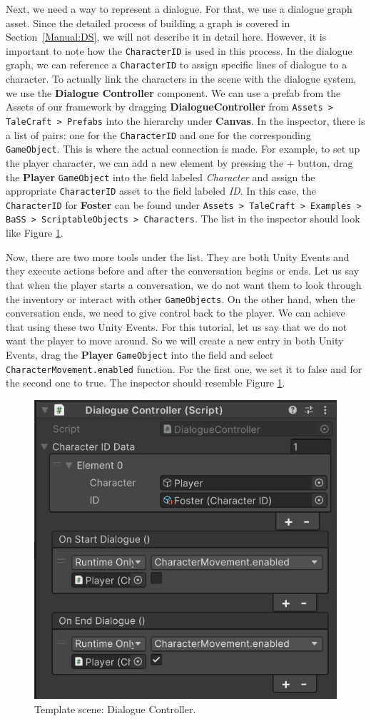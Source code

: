 Next, we need a way to represent a dialogue. For that, we use a dialogue graph asset. Since the detailed process of building a graph is covered in Section~\ref{Manual:DS}, we will not describe it in detail here. However, it is important to note how the \texttt{CharacterID} is used in this process. In the dialogue graph, we can reference a \texttt{CharacterID} to assign specific lines of dialogue to a character. To actually link the characters in the scene with the dialogue system, we use the \textbf{Dialogue Controller} component. We can use a prefab from the Assets of our framework by dragging \textbf{DialogueController} from \texttt{Assets > TaleCraft > Prefabs} into the hierarchy under \textbf{Canvas}. In the inspector, there is a list of pairs: one for the \texttt{CharacterID} and one for the corresponding \texttt{GameObject}. This is where the actual connection is made. For example, to set up the player character, we can add a new element by pressing the + button, drag the \textbf{Player} \texttt{GameObject} into the field labeled \textit{Character} and assign the appropriate \texttt{CharacterID} asset to the field labeled \textit{ID}. In this case, the \texttt{CharacterID} for \textbf{Foster} can be found under \texttt{Assets > TaleCraft > Examples > BaSS > ScriptableObjects > Characters}. The list in the inspector should look like Figure \ref{fig:Tutorial-template:DC}.

Now, there are two more tools under the list. They are both Unity Events and they execute actions before and after the conversation begins or ends. Let us say that when the player starts a conversation, we do not want them to look through the inventory or interact with other \texttt{GameObjects}. On the other hand, when the conversation ends, we need to give control back to the player. We can achieve that using these two Unity Events. For this tutorial, let us say that we do not want the player to move around. So we will create a new entry in both Unity Events, drag the \textbf{Player} \texttt{GameObject} into the field and select \texttt{CharacterMovement.enabled} function. For the first one, we set it to false and for the second one to true. The inspector should resemble Figure \ref{fig:Tutorial-template:DC}.

\begin{figure}[H]
\centering
\includegraphics[width=0.6\linewidth]{img/User doc/image_2025-07-09_104007947.png}
\caption{Template scene: Dialogue Controller.}
\label{fig:Tutorial-template:DC}
\end{figure}

